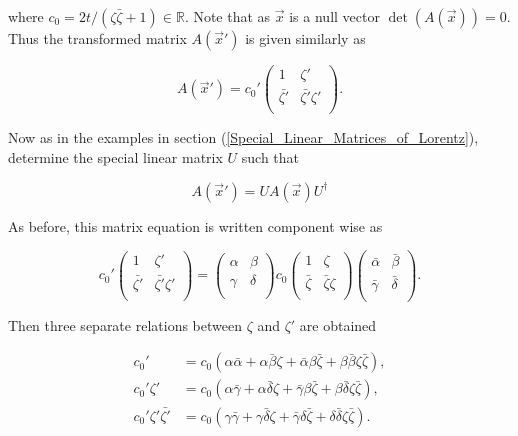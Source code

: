 \noindent where $c_0 = 2t/(\zeta\bar{\zeta}+1) \in \mathbb{R}$. Note that as $\vec{x}$ is a null vector $\det{(A(\vec{x}))} = 0$. Thus the transformed matrix $A(\vec{x}')$ is given similarly as

\begin{equation*}
A(\vec{x}') = 
{c_0}'\left(
\begin{array}{cc}
1           & \zeta' \\ 
\bar{\zeta'} & \bar{\zeta'}\zeta' \\ 
\end{array}
\right).
\end{equation*}

\noindent Now as in the examples in section (\ref{Special_Linear_Matrices_of_Lorentz}), determine the special linear matrix $U$ such that

\begin{equation}\label{Ext_Complex_UAU}
A(\vec{x}') = U A(\vec{x}) U^{\dagger}
\end{equation}

\noindent As before, this matrix equation is written component wise as

\begin{equation*}
{c_0}'\left(
\begin{array}{cc}
1           & \zeta' \\ 
\bar{\zeta'} & \bar{\zeta'}\zeta' \\ 
\end{array}
\right)
=
\left(
\begin{array}{cc}
\alpha & \beta \\
\gamma & \delta \\
\end{array}
\right)
{c_0}\left(
\begin{array}{cc}
1           & \zeta \\ 
\bar{\zeta} & \bar{\zeta}\zeta \\ 
\end{array}
\right)
\left(
\begin{array}{cc}
\bar{\alpha} & \bar{\beta} \\
\bar{\gamma} & \bar{\delta} \\
\end{array}
\right).
\end{equation*}

\noindent Then three separate relations between $\zeta$ and $\zeta'$ are obtained

\begin{align}\label{Ext_Complex_zeta_trans_1} 
{c_0}' & = c_0 (\alpha \bar{\alpha} + \alpha \bar{\beta} \zeta + \bar{\alpha} \beta \bar{\zeta} + \beta \bar{\beta} \zeta \bar{\zeta}), \\\label{Ext_Complex_zeta_trans_2} 
{c_0}'\zeta' & = c_0 (\alpha \bar{\gamma} + \alpha \bar{\delta} \zeta + \bar{\gamma} \beta \bar{\zeta} + \beta \bar{\delta} \zeta \bar{\zeta}), \\\label{Ext_Complex_zeta_trans_3} 
{c_0}'\zeta'\bar{\zeta'} & = c_0 (\gamma \bar{\gamma} + \gamma \bar{\delta} \zeta + \bar{\gamma} \delta \bar{\zeta} + \delta \bar{\delta} \zeta \bar{\zeta}). 
\end{align} 

